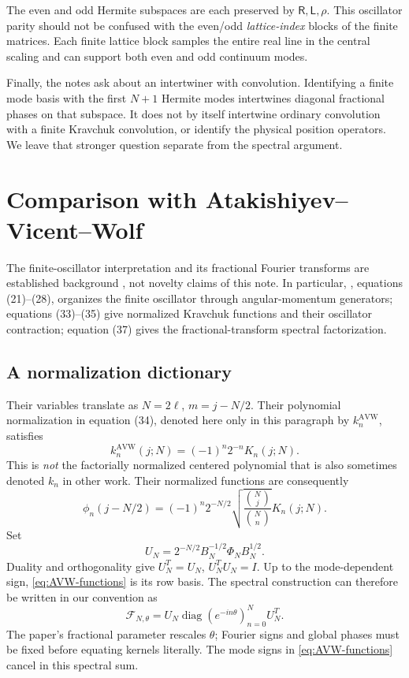 \documentclass[11pt,reqno]{amsart}
\theoremstyle{definition}\newtheorem{definition}[theorem]{Definition}
\theoremstyle{remark}\newtheorem{remark}[theorem]{Remark}
\DeclareMathOperator{\diag}{diag}
\begin{document}
The even and odd Hermite subspaces are each preserved by
$\mathsf R,\mathsf L,\rho$. This oscillator parity should not be
confused with the even/odd \emph{lattice-index} blocks of the finite
matrices. Each finite lattice block samples the entire real line in
the central scaling and can support both even and odd continuum modes.

Finally, the notes ask about an intertwiner with convolution.
Identifying a finite mode basis with the first $N+1$ Hermite modes
intertwines diagonal fractional phases on that subspace. It does not
by itself intertwine ordinary convolution with a finite Kravchuk
convolution, or identify the physical position operators. We leave
that stronger question separate from the spectral argument.

\section{Comparison with Atakishiyev--Vicent--Wolf}
\label{sec:AVW}
The finite-oscillator interpretation and its fractional Fourier
transforms are established background \cite{AW,AVW}, not novelty
claims of this note. In particular, \cite{AVW}, equations (21)--(28),
organizes the finite oscillator through angular-momentum generators;
equations (33)--(35) give normalized Kravchuk functions and their
oscillator contraction; equation (37) gives the fractional-transform
spectral factorization.

\subsection{A normalization dictionary}
Their variables translate as $N=2\ell$, $m=j-N/2$. Their polynomial
normalization in equation (34), denoted here only in this paragraph
by $k_n^{\mathrm{AVW}}$, satisfies
\[
k_n^{\mathrm{AVW}}(j;N)=(-1)^n2^{-n}K_n(j;N).
\]
This is \emph{not} the factorially normalized centered polynomial that
is also sometimes denoted $k_n$ in other work.
Their normalized functions are consequently
\begin{equation}\label{eq:AVW-functions}
\phi_n(j-N/2)=(-1)^n2^{-N/2}
\sqrt{\frac{\binom Nj}{\binom Nn}}K_n(j;N).
\end{equation}
Set
\begin{equation}\label{eq:U}
U_N=2^{-N/2}B_N^{-1/2}\Phi_NB_N^{1/2}.
\end{equation}
Duality and orthogonality give $U_N^T=U_N$, $U_N^TU_N=I$.
Up to the mode-dependent sign, \eqref{eq:AVW-functions} is its row
basis. The spectral construction can therefore be written in our
convention as
\[
\mathcal F_{N,\theta}
=U_N\diag(e^{-in\theta})_{n=0}^NU_N^T.
\]
The paper's fractional parameter rescales $\theta$; Fourier signs and
global phases must be fixed before equating kernels literally.
The mode signs in \eqref{eq:AVW-functions} cancel in this spectral sum.
\end{document}
